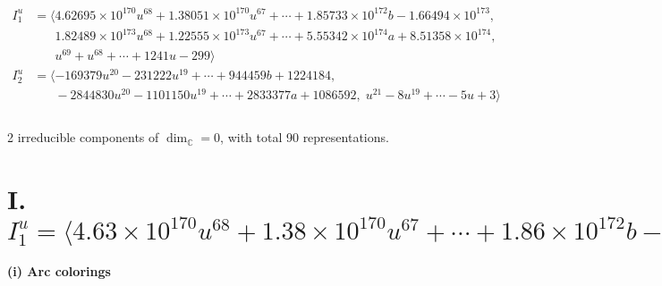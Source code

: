 \documentclass[1p]{elsarticle_modified}
\theoremstyle{definition}
\begin{document}
\begin{align*}
I^u_{1}&=\langle 
4.62695\times10^{170} u^{68}+1.38051\times10^{170} u^{67}+\cdots+1.85733\times10^{172} b-1.66494\times10^{173},\\
\phantom{I^u_{1}}&\phantom{= \langle  }1.82489\times10^{173} u^{68}+1.22555\times10^{173} u^{67}+\cdots+5.55342\times10^{174} a+8.51358\times10^{174},\\
\phantom{I^u_{1}}&\phantom{= \langle  }u^{69}+u^{68}+\cdots+1241 u-299\rangle \\
I^u_{2}&=\langle 
-169379 u^{20}-231222 u^{19}+\cdots+944459 b+1224184,\\
\phantom{I^u_{2}}&\phantom{= \langle  }-2844830 u^{20}-1101150 u^{19}+\cdots+2833377 a+1086592,\;u^{21}-8 u^{19}+\cdots-5 u+3\rangle \\
\\
\end{align*}
\raggedright * 2 irreducible components of $\dim_{\mathbb{C}}=0$, with total 90 representations.\\
\newpage
\renewcommand{\arraystretch}{1}
\centering \section*{I. $I^u_{1}= \langle 4.63\times10^{170} u^{68}+1.38\times10^{170} u^{67}+\cdots+1.86\times10^{172} b-1.66\times10^{173},\;1.82\times10^{173} u^{68}+1.23\times10^{173} u^{67}+\cdots+5.55\times10^{174} a+8.51\times10^{174},\;u^{69}+u^{68}+\cdots+1241 u-299 \rangle$}
\flushleft \textbf{(i) Arc colorings}\\
\end{document}
